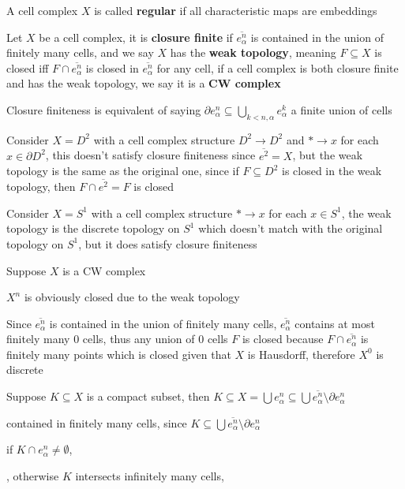 \documentclass[main]{subfiles}
\begin{document}
\begin{definition}
A cell complex $X$ is called \textbf{regular} if all characteristic maps are embeddings
\end{definition}

\begin{definition}
Let $X$ be a cell complex, it is \textbf{closure finite} if $\overline{e^n_\alpha}$ is contained in the union of finitely many cells, and we say $X$ has the \textbf{weak topology}, meaning $F\subseteq X$ is closed iff $F\cap\overline{e^n_\alpha}$ is closed in $\overline{e^n_\alpha}$ for any cell, if a cell complex is both closure finite and has the weak topology, we say it is a \textbf{CW complex} \par
Closure finiteness is equivalent of saying $\partial e^n_\alpha\subseteq\displaystyle\bigcup_{k< n,\alpha}e^k_\alpha$ a finite union of cells \par
\end{definition}

\begin{example}
Consider $X=D^2$ with a cell complex structure $D^2\to D^2$ and $*\to x$ for each $x\in\partial D^2$, this doesn't satisfy closure finiteness since $\overline{e^2}=X$, but the weak topology is the same as the original one, since if $F\subseteq D^2$ is closed in the weak topology, then $F\cap\overline{e^2}=F$ is closed \par
Consider $X=S^1$ with a cell complex structure $*\to x$ for each $x\in S^1$, the weak topology is the discrete topology on $S^1$ which doesn't match with the original topology on $S^1$, but it does satisfy closure finiteness \par
\end{example}

\begin{remark}
Suppose $X$ is a CW complex \par
$X^n$ is obviously closed due to the weak topology \par
Since $\overline{e^n_\alpha}$ is contained in the union of finitely many cells, $\overline{e^n_\alpha}$ contains at most finitely many $0$ cells, thus any union of $0$ cells $F$ is closed because $F\cap\overline{e^n_\alpha}$ is finitely many points which is closed given that $X$ is Hausdorff, therefore $X^0$ is discrete \par
Suppose $K\subseteq X$ is a compact subset, then $K\subseteq X=\bigcup e^n_\alpha\subseteq\bigcup \overline{e^n_\alpha}\setminus\partial e^n_\alpha$

contained in finitely many cells, since $K\subseteq\bigcup \overline{e^n_\alpha}\setminus\partial e^n_\alpha$

if $K\cap e^n_\alpha\neq\emptyset$, 

, otherwise $K$ intersects infinitely many cells, 
\end{remark}
\end{document}
